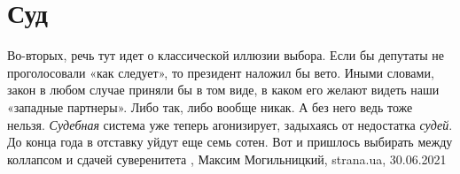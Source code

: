  
 
 
 
 
\chapter{Суд}
\label{sec:slova.sud}

Во-вторых, речь тут идет о классической иллюзии выбора. Если бы депутаты не
проголосовали «как следует», то президент наложил бы вето. Иными словами, закон
в любом случае приняли бы в том виде, в каком его желают видеть наши «западные
партнеры». Либо так, либо вообще никак.  А без него ведь тоже нельзя. \emph{Судебная}
система уже теперь агонизирует, задыхаясь от недостатка \emph{судей}. До конца года в
отставку уйдут еще семь сотен. Вот и пришлось выбирать между коллапсом и сдачей
суверенитета
, 
Максим Могильницкий, strana.ua, 30.06.2021

